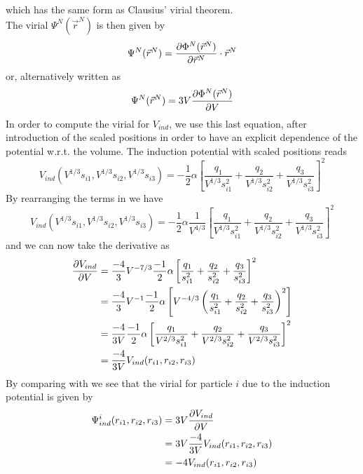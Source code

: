 \documentclass[utf8]{article}
\begin{document}
%
which has the same form as Clausius' virial theorem.\\
The virial $\Psi^N(\vec{r}^N)$ is then given by
%
\begin{equation}
    \Psi^N(\vec{r}^N) = \frac{\partial \Phi^N(\vec{r}^N)}{\partial \vec{r}^N} \cdot \vec{r}^N
\end{equation}
%
or, alternatively written as
%
\begin{equation}\label{eq:virial}
    \Psi^N(\vec{r}^N) = 3V \frac{\partial \Phi^N(\vec{r}^N)}{\partial V}
\end{equation}
%
In order to compute the virial for $V_{ind}$, we use this last equation, after introduction
of the scaled positions in order to have an explicit dependence of the potential w.r.t. the
volume.
The induction potential with scaled positions reads
%
\begin{equation}\label{eq:V_ind_scaled}
    V_{ind}(V^{1/3}s_{i1},V^{1/3}s_{i2},V^{1/3}s_{i3}) = - \frac{1}{2} \alpha \left[
        \frac{q_1}{V^{1/3}s_{i1}^2} + \frac{q_2}{V^{1/3}s_{i2}^2}
        + \frac{q_3}{V^{1/3}s_{i3}^2} \right]^2
\end{equation}
%
By rearranging the terms in  we have
%
\begin{equation}\label{eq:V_ind_scaled}
    V_{ind}(V^{1/3}s_{i1},V^{1/3}s_{i2},V^{1/3}s_{i3}) = -\frac{1}{2}\alpha\frac{1}{V^{4/3}}
    \left[ \frac{q_1}{V^{1/3}s_{i1}^2} + \frac{q_2}{V^{1/3}s_{i2}^2}
        + \frac{q_3}{V^{1/3}s_{i3}^2} \right]^2
\end{equation}
%
and we can now take the derivative as
%
\begin{align}\label{eq:dVdV_ind}
    \frac{\partial V_{ind}}{\partial V} &= \frac{-4}{3} V^{-7/3} \frac{-1}{2} \alpha \left[ 
        \frac{q_1}{s_{i1}^2} + \frac{q_2}{s_{i2}^2} + \frac{q_3}{s_{i3}^2} \right]^2 \\
        &= \frac{-4}{3} V^{-1} \frac{-1}{2} \alpha \left[ V^{-4/3} \left(
        \frac{q_1}{s_{i1}^2} + \frac{q_2}{s_{i2}^2} + \frac{q_3}{s_{i3}^2} \right)^2 \right] \\
        &= \frac{-4}{3V} \frac{-1}{2} \alpha \left[ \frac{q_1}{V^{2/3}s_{i1}^2}
        + \frac{q_2}{V^{2/3}s_{i2}^2} + \frac{q_3}{V^{2/3}s_{i3}^2} \right]^2 \\
        &= \frac{-4}{3V} V_{ind} (r_{i1},r_{i2},r_{i3})
\end{align}
%
By comparing  with  we see that the virial for particle $i$
due to the induction potential is given by
%
\begin{align}
    \Psi_{ind}^i(r_{i1},r_{i2},r_{i3}) &= 3V \frac{\partial V_{ind}}{\partial V} \\
        &= 3V \frac{-4}{3V} V_{ind}(r_{i1},r_{i2},r_{i3}) \\
        &= -4 V_{ind}(r_{i1},r_{i2},r_{i3})
\end{align}
%
\end{document}
